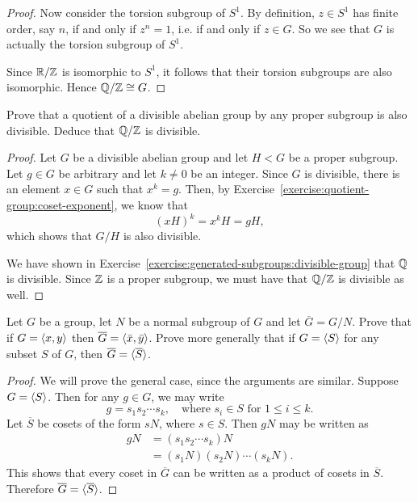 \begin{enumerate}
\begin{proof}
    Now consider the torsion subgroup of $S^1$. By definition, $z\in S^1$
    has finite order, say $n$, if and only if $z^n = 1$, i.e. if and
    only if $z\in G$. So we see that $G$ is actually the torsion
    subgroup of $S^1$.

    Since $\mathbb{R}/\mathbb{Z}$ is isomorphic to $S^1$, it follows that their
    torsion subgroups are also isomorphic. Hence $\mathbb{Q}/\mathbb{Z}\cong G$.
  \end{proof}
\end{enumerate}

 Prove that a quotient of a divisible abelian group by
any proper subgroup is also divisible. Deduce that $\mathbb{Q}/\mathbb{Z}$ is
divisible.
\begin{proof}
  Let $G$ be a divisible abelian group and let $H<G$ be a proper
  subgroup. Let $g\in G$ be arbitrary and let $k\neq0$ be an
  integer. Since $G$ is divisible, there is an element $x\in G$ such
  that $x^k = g$. Then, by
  Exercise~\ref{exercise:quotient-group:coset-exponent}, we know that
  \begin{equation*}
    (xH)^k = x^kH = gH,
  \end{equation*}
  which shows that $G/H$ is also divisible.

  We have shown in
  Exercise~\ref{exercise:generated-subgroups:divisible-group} that
  $\mathbb{Q}$ is divisible. Since $\mathbb{Z}$ is a proper subgroup, we must have
  that $\mathbb{Q}/\mathbb{Z}$ is divisible as well.
\end{proof}

\label{exercise:quotient-group:generators}
Let $G$ be a group, let $N$ be a normal subgroup of $G$ and let
$\overline{G} = G/N$. Prove that if $G = \langle{x,y}\rangle$ then
$\overline{G} = \langle{\bar x,\bar y}\rangle$. Prove more generally that if
$G = \langle{S}\rangle$ for any subset $S$ of $G$, then
$\overline{G} = \langle{\overline{S}}\rangle$.
\begin{proof}
  We will prove the general case, since the arguments are
  similar. Suppose $G = \langle{S}\rangle$. Then for any $g\in G$, we may write
  \begin{equation*}
    g = s_1s_2\cdots s_k,
    \quad\text{where $s_i\in S$ for $1\leq i\leq k$}.
  \end{equation*}
  Let $\overline{S}$ be cosets of the form $sN$, where $s\in S$. Then
  $gN$ may be written as
  \begin{align*}
    gN &= (s_1s_2\cdots s_k)N \\
       &= (s_1N)(s_2N)\cdots(s_kN).
  \end{align*}
  This shows that every coset in $\overline{G}$ can be written as a
  product of cosets in $\overline{S}$. Therefore
  $\overline{G} = \langle{\overline{S}}\rangle$.
\end{proof}

